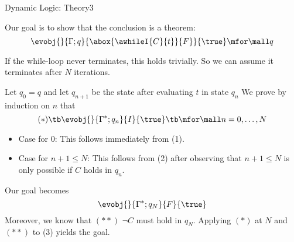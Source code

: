 \documentclass[a4paper]{article}
\begin{document}
\begin{problem}{Dynamic Logic: Theory}{3}
\begin{solution}
Our goal is to show that the conclusion is a theorem:
\[\evobj{}{\Gamma;q}{\abox{\awhileI{C}{t}}{F}}{\true} \mfor\mall q\]

If the while-loop never terminates, this holds trivially.
So we can assume it terminates after $N$ iterations.

Let $q_0=q$ and let $q_{n+1}$ be the state after evaluating $t$ in state $q_n$
We prove by induction on $n$ that
\[(*)\tb \evobj{}{\Gamma^*;q_n}{I}{\true} \tb\mfor\mall n=0,\ldots,N\]
\begin{itemize}
 \item Case for $0$: This follows immediately from (1).
 \item Case for $n+1\leq N$: This follows from (2) after observing that $n+1\leq N$ is only possible if $C$ holds in $q_n$.
\end{itemize}

Our goal becomes
\[\evobj{}{\Gamma^*;q_N}{F}{\true}\]
Moreover, we know that $(**)$ $\neg C$ must hold in $q_N$.
Applying $(*)$ at $N$ and $(**)$ to (3) yields the goal.
\end{solution}
\end{problem}
\end{document}
